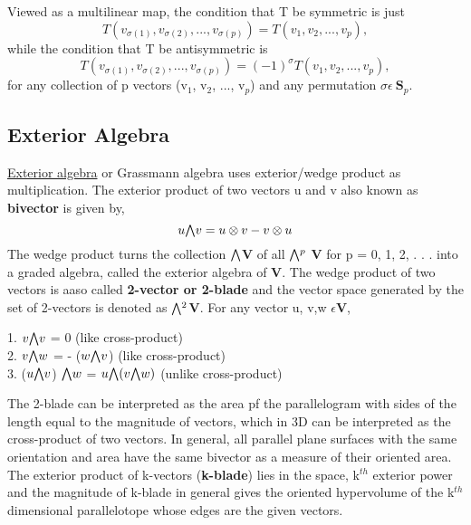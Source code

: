 Viewed as a multilinear map, the condition that T be symmetric is just
\begin{equation}
    T(v_{\sigma(1)}, v_{\sigma(2)} , . . . , v_{\sigma(p)} ) = T (v_1 , v_2 , . . . , v_p ),
\end{equation}
while the condition that T be antisymmetric is
\begin{equation}
    T(v_{\sigma(1)}, v_{\sigma(2)} , . . . , v_{\sigma(p)} ) = (-1)^{\sigma} T (v_1 , v_2 , . . . , v_p ),
\end{equation}
for any collection of p vectors (v$_1$, v$_2$, ..., v$_p$) and any permutation $\sigma \epsilon \: \textbf{S}_p$.

\subsection{Exterior Algebra}
\href{https://en.wikipedia.org/wiki/Exterior_algebra}{Exterior algebra} or Grassmann algebra uses exterior/wedge product
as multiplication. The exterior product of two vectors u and v also known as \textbf{bivector} is given by,
\begin{equation}
    u \exterior v = u \otimes v - v \otimes u
\end{equation}
The wedge product turns the collection $\exterior$\textbf{V} of all $\exterior^p$ \textbf{V} for p = 0, 1, 2, . . . into a
graded algebra, called the exterior algebra of \textbf{V}.
The wedge product of two vectors is aaso called \textbf{2-vector or 2-blade} and the vector space generated by the set
of 2-vectors is denoted as $\exterior^2$\textbf{V}. For any vector u, v,w $\epsilon \textbf{V}$,

1. $v \exterior v$ = 0 \hspace{2cm}(like cross-product) \\
2. $v \exterior w$ = - ($w \exterior v$) \hspace{2cm}(like cross-product) \\
3. ($u \exterior v$) $\exterior w$ = $  u \exterior (v \exterior w)$  \hspace{2cm}(unlike cross-product)

The 2-blade can be interpreted as the area pf the parallelogram with sides of the length equal to the
magnitude of vectors, which in 3D can be interpreted as the cross-product of two vectors.
In general, all parallel plane surfaces with the same orientation and area have the same bivector as a measure of their oriented area.
The exterior product of k-vectors (\textbf{k-blade}) lies in the space, k$^{th}$ exterior power and the magnitude of k-blade in general 
gives the oriented hypervolume of the k$^{th}$ dimensional parallelotope whose edges are the given vectors.

